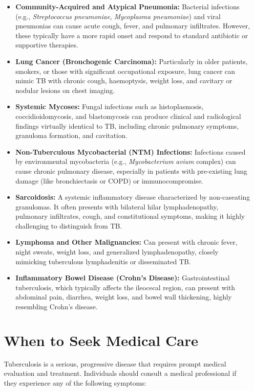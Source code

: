 \begin{itemize}
    \item \textbf{Community-Acquired and Atypical Pneumonia:} Bacterial infections (e.g., \textit{Streptococcus pneumoniae}, \textit{Mycoplasma pneumoniae}) and viral pneumonias can cause acute cough, fever, and pulmonary infiltrates. However, these typically have a more rapid onset and respond to standard antibiotic or supportive therapies.
    \item \textbf{Lung Cancer (Bronchogenic Carcinoma):} Particularly in older patients, smokers, or those with significant occupational exposure, lung cancer can mimic TB with chronic cough, haemoptysis, weight loss, and cavitary or nodular lesions on chest imaging.
    \item \textbf{Systemic Mycoses:} Fungal infections such as histoplasmosis, coccidioidomycosis, and blastomycosis can produce clinical and radiological findings virtually identical to TB, including chronic pulmonary symptoms, granuloma formation, and cavitation.
    \item \textbf{Non-Tuberculous Mycobacterial (NTM) Infections:} Infections caused by environmental mycobacteria (e.g., \textit{Mycobacterium avium} complex) can cause chronic pulmonary disease, especially in patients with pre-existing lung damage (like bronchiectasis or COPD) or immunocompromise.
    \item \textbf{Sarcoidosis:} A systemic inflammatory disease characterized by non-caseating granulomas. It often presents with bilateral hilar lymphadenopathy, pulmonary infiltrates, cough, and constitutional symptoms, making it highly challenging to distinguish from TB.
    \item \textbf{Lymphoma and Other Malignancies:} Can present with chronic fever, night sweats, weight loss, and generalized lymphadenopathy, closely mimicking tuberculous lymphadenitis or disseminated TB.
    \item \textbf{Inflammatory Bowel Disease (Crohn's Disease):} Gastrointestinal tuberculosis, which typically affects the ileocecal region, can present with abdominal pain, diarrhea, weight loss, and bowel wall thickening, highly resembling Crohn's disease.
\end{itemize}

\section*{When to Seek Medical Care}
Tuberculosis is a serious, progressive disease that requires prompt medical evaluation and treatment. Individuals should consult a medical professional if they experience any of the following symptoms:

